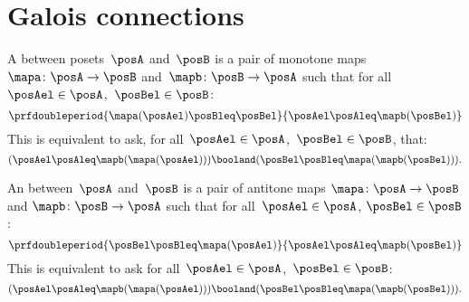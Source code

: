 

\section{Galois connections}\label{subsec:galois-connections}

\begin{ctdefinition}
	A \emph{} between posets~$\posA$ and~$\posB$ is a pair of monotone maps~$\mapa\colon \posA\to \posB$ and~$\mapb\colon \posB\to \posA$ such that for all~$\posAel\in \posA$,~$\posBel\in \posB$:
	\begin{equation}
		\prfdoubleperiod{\mapa(\posAel) \posBleq \posBel}{\posAel \posAleq \mapb(\posBel)}
	\end{equation}
	This is equivalent to ask, for all~$\posAel\in \posA$,~$\posBel\in \posB$, that:
	\begin{equation}
		(\posAel\posAleq \mapb(\mapa(\posAel)))
		\booland (\posBel\posBleq \mapa(\mapb(\posBel))).
	\end{equation}
\end{ctdefinition}

\begin{ctdefinition}
	An \emph{} between~$\posA$ and~$\posB$ is a pair of antitone maps $\mapa\colon \posA\to \posB$ and $\mapb \colon \posB\to \posA$ such that for all~$\posAel\in \posA$, $\posBel\in \posB$:
	\begin{equation}
		\prfdoubleperiod{\posBel \posBleq \mapa(\posAel)}{\posAel \posAleq \mapb(\posBel)}
	\end{equation}
	This is equivalent to ask for all~$\posAel\in \posA$,~$\posBel\in \posB$:
	\begin{equation}
		(\posAel \posAleq \mapb(\mapa(\posAel)))
		\booland  (\posBel \posBleq \mapa(\mapb(\posBel))).
	\end{equation}
\end{ctdefinition}

